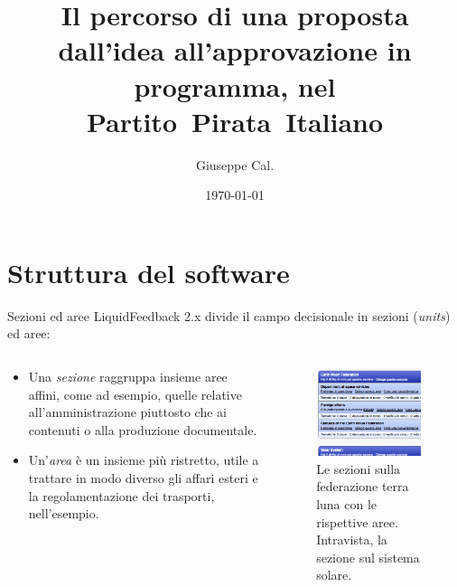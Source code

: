 \documentclass{beamer}
\title{Il percorso di una proposta dall'idea all'approvazione in programma, nel Partito~Pirata~Italiano}
\author{Giuseppe Cal.}
\institute{Partito Pirata Italiano -- Pirate Party of Italy}
\date{\today}
\begin{document}
\begin{frame}
\maketitle
\end{frame}
\section{Struttura del software}
\begin{frame}{Sezioni ed aree}
LiquidFeedback 2.x divide il campo decisionale in sezioni (\emph{units}) ed aree: 
\begin{columns}
\begin{column}{0.5\textwidth}
\begin{itemize}
\item Una \emph{sezione} raggruppa insieme aree affini, come ad esempio, quelle relative all'amministrazione piuttosto che ai contenuti o alla produzione documentale.
\item Un'\emph{area} \`e un insieme pi\`u ristretto, utile a trattare in modo diverso gli affari esteri e la regolamentazione dei trasporti, nell'esempio.
\end{itemize}
\end{column}
\begin{column}{0.5\textwidth}
\begin{figure}
\includegraphics[width=0.95\textwidth]{pics/unitarea}
\caption{Le sezioni sulla federazione terra luna con le rispettive aree. Intravista, la sezione sul sistema solare.}
\end{figure}
\end{column}
\end{columns}
\end{frame}
\end{document}

